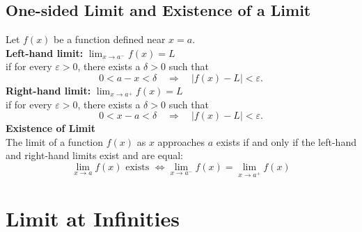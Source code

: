 \documentclass[11pt]{article}
\begin{document}
\subsection{One-sided Limit and Existence of a Limit}
Let $f(x)$ be a function defined near $x = a$.\\[.5em]
\textbf{Left-hand limit:}  
$
    \displaystyle
    \lim_{x \to a^-}f(x) = L
$\\
if for every $\varepsilon > 0$, there exists a $\delta > 0$ such that
\[
    0<a-x<\delta\quad\Rightarrow\quad|f(x)-L|<\varepsilon.
\]
\noindent
\textbf{Right-hand limit:}
$
    \displaystyle
    \lim_{x \to a^+} f(x) = L
$\\
if for every $\varepsilon > 0$, there exists a $\delta > 0$ such that
\[
    0<x-a<\delta\quad\Rightarrow\quad|f(x)-L|<\varepsilon.
\]
\textbf{Existence of Limit}\\
The limit of a function $f(x)$ as $x$ approaches $a$ exists if and only if the left-hand and right-hand limits exist and are equal:
\[
    \lim_{x \to a} f(x) \text{ exists } \iff \lim_{x \to a^-} f(x) = \lim_{x \to a^+} f(x)
\]

\section{Limit at Infinities}
\end{document}
